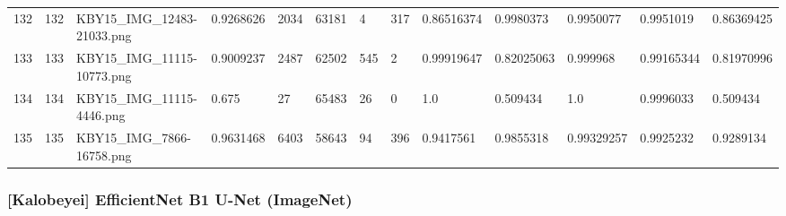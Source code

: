 \documentclass[11pt, a4paper, twoside]{report}
\begin{document}
\begin{longtable}[c]{@{}lllllllllllll@{}}
132 & 132 & KBY15\_IMG\_12483-21033.png & 0.9268626 & 2034 & 63181 & 4 & 317 & 0.86516374 & 0.9980373 & 0.9950077 & 0.9951019 & 0.86369425 \\
133 & 133 & KBY15\_IMG\_11115-10773.png & 0.9009237 & 2487 & 62502 & 545 & 2 & 0.99919647 & 0.82025063 & 0.999968 & 0.99165344 & 0.81970996 \\
134 & 134 & KBY15\_IMG\_11115-4446.png & 0.675 & 27 & 65483 & 26 & 0 & 1.0 & 0.509434 & 1.0 & 0.9996033 & 0.509434 \\
135 & 135 & KBY15\_IMG\_7866-16758.png & 0.9631468 & 6403 & 58643 & 94 & 396 & 0.9417561 & 0.9855318 & 0.99329257 & 0.9925232 & 0.9289134 \\* \bottomrule
\end{longtable}

\newpage

\subsubsection{[Kalobeyei] EfficientNet B1 U-Net (ImageNet)}
\end{document}
